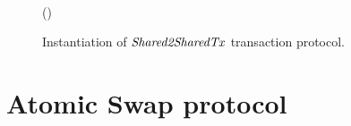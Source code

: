 \begin{figure}
\begin{center}
{\begin{varwidth}{\textwidth}
{              \< \< \\
            \varSigFin \opFunResult \procFinSig{\varSigAlice}{\varSigBob} \< \< \\
            \varExcess \opAssign {} \opAddPoint {} \< \< \\
            \scriptstyle \pcreturn \varTx \opAssign \varTx \opUnion (\varExcess \opSeperate \varSigFin \opSeperate \varProof)
            }
        \end{varwidth}
        }
    \end{center}
    \caption{Instantiation of $\mathit{Shared2SharedTx}$ transaction protocol. \label{fig:Mu2MuTx}}
\end{figure}

\section{Atomic Swap protocol}\label{sec:atomic-swap}